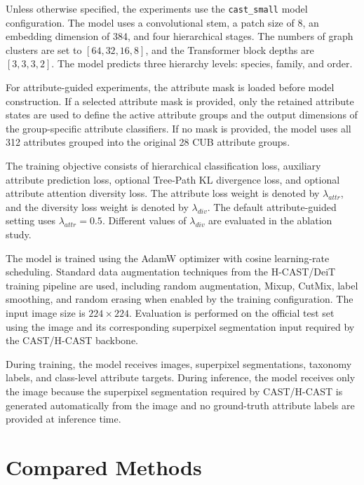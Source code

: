 Unless otherwise specified, the experiments use the \texttt{cast\_small} model configuration. The model uses a convolutional stem, a patch size of 8, an embedding dimension of 384, and four hierarchical stages. The numbers of graph clusters are set to \([64, 32, 16, 8]\), and the Transformer block depths are \([3, 3, 3, 2]\). The model predicts three hierarchy levels: species, family, and order.

For attribute-guided experiments, the attribute mask is loaded before model construction. If a selected attribute mask is provided, only the retained attribute states are used to define the active attribute groups and the output dimensions of the group-specific attribute classifiers. If no mask is provided, the model uses all 312 attributes grouped into the original 28 CUB attribute groups.

The training objective consists of hierarchical classification loss, auxiliary attribute prediction loss, optional Tree-Path KL divergence loss, and optional attribute attention diversity loss. The attribute loss weight is denoted by \(\lambda_{attr}\), and the diversity loss weight is denoted by \(\lambda_{div}\). The default attribute-guided setting uses \(\lambda_{attr}=0.5\). Different values of \(\lambda_{div}\) are evaluated in the ablation study.

The model is trained using the AdamW optimizer with cosine learning-rate scheduling. Standard data augmentation techniques from the H-CAST/DeiT training pipeline are used, including random augmentation, Mixup, CutMix, label smoothing, and random erasing when enabled by the training configuration. The input image size is \(224 \times 224\). Evaluation is performed on the official test set using the image and its corresponding superpixel segmentation input required by the CAST/H-CAST backbone.

During training, the model receives images, superpixel segmentations, taxonomy labels, and class-level attribute targets. During inference, the model receives only the image because the superpixel segmentation required by CAST/H-CAST is generated automatically from the image and no ground-truth attribute labels are provided at inference time.






\section{Compared Methods}

